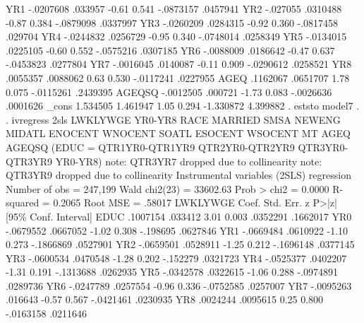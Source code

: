          YR1 {\VBAR}  -.0207608    .033957    -0.61   0.541    -.0873157    .0457941
         YR2 {\VBAR}   -.027055   .0310488    -0.87   0.384    -.0879098    .0337997
         YR3 {\VBAR}  -.0260209   .0284315    -0.92   0.360    -.0817458     .029704
         YR4 {\VBAR}  -.0244832   .0256729    -0.95   0.340    -.0748014    .0258349
         YR5 {\VBAR}  -.0134015   .0225105    -0.60   0.552    -.0575216    .0307185
         YR6 {\VBAR}  -.0088009   .0186642    -0.47   0.637    -.0453823    .0277804
         YR7 {\VBAR}  -.0016045   .0140087    -0.11   0.909    -.0290612    .0258521
         YR8 {\VBAR}   .0055357   .0088062     0.63   0.530    -.0117241    .0227955
        AGEQ {\VBAR}   .1162067   .0651707     1.78   0.075    -.0115261    .2439395
      AGEQSQ {\VBAR}  -.0012505    .000721    -1.73   0.083    -.0026636    .0001626
       _cons {\VBAR}   1.534505   1.461947     1.05   0.294    -1.330872    4.399882
{\smallskip}
. eststo model7
{\smallskip}
. 
. ivregress 2sls LWKLYWGE YR0-YR8 RACE MARRIED SMSA NEWENG MIDATL ENOCENT WNOCENT SOATL ESOCENT WSOCENT MT AGEQ AGEQSQ (EDUC = QTR1YR0-QTR1YR9 QTR2YR0-QTR2YR9 QTR3YR0-QTR3YR9 YR0-YR8)
note: QTR3YR7 dropped due to collinearity
note: QTR3YR9 dropped due to collinearity
{\smallskip}
Instrumental variables (2SLS) regression          Number of obs   =    247,199
                                                  Wald chi2(23)   =   33602.63
                                                  Prob > chi2     =     0.0000
                                                  R-squared       =     0.2065
                                                  Root MSE        =     .58017
{\smallskip}
    LWKLYWGE {\VBAR}      Coef.   Std. Err.      z    P>|z|     [95\% Conf. Interval]
        EDUC {\VBAR}   .1007154    .033412     3.01   0.003     .0352291    .1662017
         YR0 {\VBAR}  -.0679552   .0667052    -1.02   0.308     -.198695    .0627846
         YR1 {\VBAR}  -.0669484   .0610922    -1.10   0.273    -.1866869    .0527901
         YR2 {\VBAR}  -.0659501   .0528911    -1.25   0.212    -.1696148    .0377145
         YR3 {\VBAR}  -.0600534   .0470548    -1.28   0.202     -.152279    .0321723
         YR4 {\VBAR}  -.0525377   .0402207    -1.31   0.191    -.1313688    .0262935
         YR5 {\VBAR}  -.0342578   .0322615    -1.06   0.288    -.0974891    .0289736
         YR6 {\VBAR}  -.0247789   .0257554    -0.96   0.336    -.0752585    .0257007
         YR7 {\VBAR}  -.0095263    .016643    -0.57   0.567    -.0421461    .0230935
         YR8 {\VBAR}   .0024244   .0095615     0.25   0.800    -.0163158    .0211646
